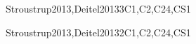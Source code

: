\begin{syllabus}
\begin{unit}{\ALAlgorithmicStrategies}{}{Stroustrup2013,Deitel2013}{3}{C1,C2,C24,CS1}
    \begin{topics}
        \item \ALAlgorithmicStrategiesTopicBrute
		\item \ALAlgorithmicStrategiesTopicGreedy
		\item \ALAlgorithmicStrategiesTopicDivide
		\item \ALAlgorithmicStrategiesTopicRecursive
		\item \ALAlgorithmicStrategiesTopicDynamic
    \end{topics}
    \begin{learningoutcomes}
        \item \ALAlgorithmicStrategiesLOFor [\Familiarity] 
		\item \ALAlgorithmicStrategiesLOUseA [\Assessment] 
		\item \ALAlgorithmicStrategiesLOUseAConquer [\Usage] 
		\item \ALAlgorithmicStrategiesLOUseRecursive [\Usage] 
		\item \ALAlgorithmicStrategiesLOUseDynamic [\Usage] 
		\item \ALAlgorithmicStrategiesLODetermineAn [\Assessment] 
		\item \ALAlgorithmicStrategiesLODescribe [\Familiarity] 
    \end{learningoutcomes}
\end{unit}

\begin{unit}{\ALBasicAnalysis}{}{Stroustrup2013,Deitel2013}{2}{C1,C2,C24,CS1}
    \begin{topics}
        \item \ALBasicAnalysisTopicDifferences
    \end{topics}
    \begin{learningoutcomes}
        \item \ALBasicAnalysisLOExplain	[\Familiarity]
    \end{learningoutcomes}
\end{unit}


\end{syllabus}
